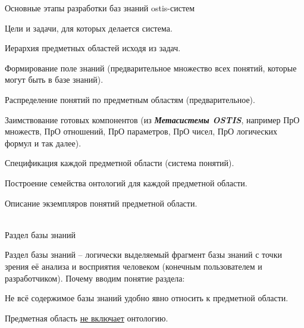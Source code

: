 \begin{frame}{Основные этапы разработки баз знаний ostis-систем}
	\topline
	\justifying
	\vspace{8mm}
	\begin{textitemize}
		\item Цели и задачи, для которых делается система. 
		\item Иерархия предметных областей исходя из задач. 
		\begin{textitemize}
			\item Формирование поле знаний (предварительное множество всех понятий, которые могут быть в базе знаний). 
			\item Распределение понятий по предметным областям (предварительное).
			\item Заимствование готовых компонентов (из \textbf{\textit{Метасистемы OSTIS}}, например ПрО множеств, ПрО отношений, ПрО параметров, ПрО чисел, ПрО логических формул и так далее).
		\end{textitemize}
		\item Спецификация каждой предметной области (система понятий).
		\item Построение семейства онтологий для каждой предметной области. 
		\item Описание экземпляров понятий предметной области.
	\end{textitemize}
\end{frame}

\begin{frame}{\\Раздел базы знаний}
	\topline
	\justifying
	\vspace{8mm}
	
	Раздел базы знаний -- логически выделяемый фрагмент базы знаний с точки зрения её анализа и восприятия человеком (конечным пользователем и разработчиком).
	\bigskip
	Почему вводим понятие раздела:
	\begin{textitemize}
		\item Не всё содержимое базы знаний удобно явно относить к предметной области.
		\item Предметная область \underline{не включает} онтологию. 
	\end{textitemize}
	
\end{frame}

